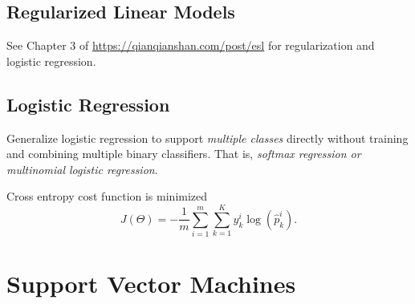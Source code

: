 \documentclass[12pt,oneside,a4paper]{article}
\numberwithin{equation}{section}
\begin{document}
\subsection{Regularized Linear Models}
See Chapter 3 of \href{https://qianqianshan.com/post/elementsofstatisticallearning/}{https://qianqianshan.com/post/esl} for regularization and logistic regression.


\subsection{Logistic Regression}
Generalize logistic regression to support \emph{multiple classes} directly without training and combining multiple binary classifiers. That is, \emph{softmax regression or multinomial logistic regression}.

Cross entropy cost function is minimized 
\begin{equation}
J(\Theta) = - \frac{1}{m} \sum_{i=1}^{m} \sum_{k=1}^{K} y_k^{i} \log (\hat{p}_k^i).
\end{equation}

\section{Support Vector Machines}
\end{document}

